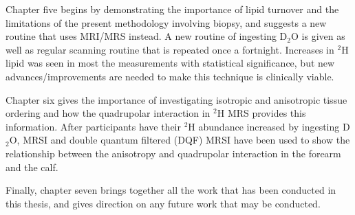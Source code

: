 \documentclass[class=article, crop=false]{standalone}
\begin{document}
Chapter five begins by demonstrating the importance of lipid turnover and the limitations of the present methodology involving biopsy, and suggests a new routine that uses MRI/MRS instead. A new routine of ingesting D$_2$O is given as well as regular scanning routine that is repeated once a fortnight. Increases in $^2$H lipid was seen in most the measurements with statistical significance, but new advances/improvements are needed to make this technique is clinically viable.

Chapter six gives the importance of investigating isotropic and anisotropic tissue ordering and how the quadrupolar interaction in $^2$H MRS provides this information. After participants have their $^2$H abundance increased by ingesting D$_2$O, MRSI and double quantum filtered (DQF) MRSI have been used to show the relationship between the anisotropy and quadrupolar interaction in the forearm and the calf.

Finally, chapter seven brings together all the work that has been conducted in this thesis, and gives direction on any future work that may be conducted.

\end{document}
